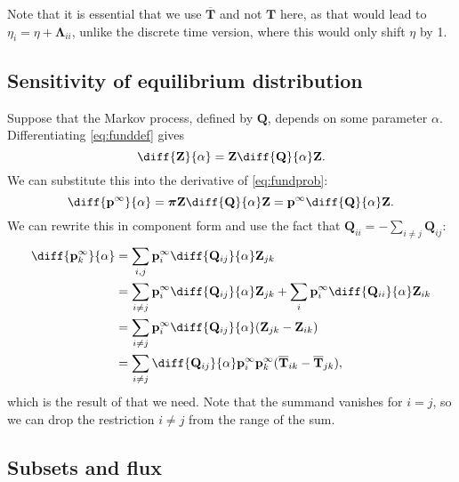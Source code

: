 \documentclass{article} %
\newcommand{\MM}{\mathbf{Q}}
\newcommand{\pr}{\mathbf{p}}
\newcommand{\eq}{\pr^\infty}
\newcommand{\fpt}{\mathbf{T}}
\newcommand{\fptb}{\overline{\fpt}}
\newcommand{\fund}{\mathbf{Z}}
\newcommand{\pib}{\boldsymbol{\pi}}
\newcommand{\Lb}{\boldsymbol{\Lambda}}
\begin{document}
Note that it is essential that we use $\fptb$ and not $\fpt$ here, as that would lead to $\eta_i=\eta+\Lb_{ii}$, unlike the discrete time version, where this would only shift $\eta$ by 1.

\subsection{Sensitivity of equilibrium distribution}\label{sec:sensitivity}

Suppose that the Markov process, defined by $\MM$, depends on some parameter $\alpha$.
Differentiating \eqref{eq:funddef} gives
%
\begin{equation}\label{eq:diffZ}
  \diff{\fund}{\alpha} = \fund \diff{\MM}{\alpha} \fund.
\end{equation}
%
We can substitute this into the derivative of \eqref{eq:fundprob}:
%
\begin{equation}\label{eq:diffp}
  \diff{\eq}{\alpha} = \pib \fund \diff{\MM}{\alpha} \fund = \eq \diff{\MM}{\alpha} \fund.
\end{equation}
%
We can rewrite this in component form and use the fact that $\MM_{ii} = - \sum_{i\neq j} \MM_{ij}$:
%
\begin{equation}\label{eq:diffpT}
\begin{aligned}
  \diff{\eq_k}{\alpha} &= \sum_{i,j} \eq_i \diff{\MM_{ij}}{\alpha} \fund_{jk} \\
    &= \sum_{i\neq j} \eq_i \diff{\MM_{ij}}{\alpha} \fund_{jk} + \sum_i \eq_i \diff{\MM_{ii}}{\alpha} \fund_{ik} \\
    &= \sum_{i\neq j} \eq_i \diff{\MM_{ij}}{\alpha} (\fund_{jk} - \fund_{ik}) \\
    &= \sum_{i\neq j} \diff{\MM_{ij}}{\alpha} \eq_i \eq_k (\fptb_{ik} - \fptb_{jk}),
\end{aligned}
\end{equation}
%
which is the result of \cite{cho2000markov} that we need.
Note that the summand vanishes for $i=j$, so we can drop the restriction $i\neq j$ from the range of the sum.

\subsection{Subsets and flux}\label{sec:subsets}
\end{document}
